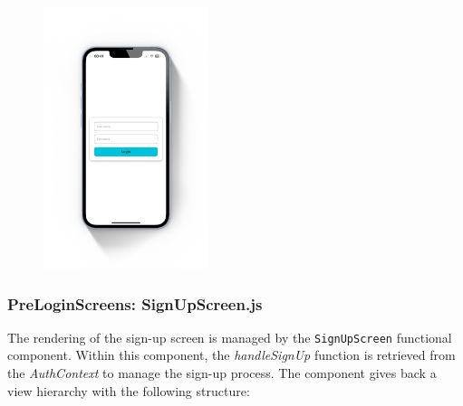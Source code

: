 \begin{figure}[!ht]
    \centering
    \includegraphics[width=0.43\textwidth]
    {LATEX/Appendices/Images/Software/Frontend/login_screen.png}
    \label{fig:login screen}
\end{figure}

\subsubsection{PreLoginScreens: SignUpScreen.js} 

The rendering of the sign-up screen is managed by the \texttt{SignUpScreen} functional component. Within this component, the \textit{handleSignUp} function is retrieved from the \textit{AuthContext} to manage the sign-up process. The component gives back a view hierarchy with the following structure:

